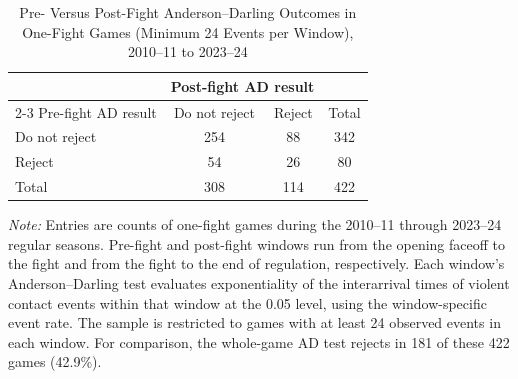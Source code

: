 \begin{table}[htbp]
\centering
\caption{Pre- Versus Post-Fight Anderson--Darling Outcomes in One-Fight Games (Minimum 24 Events per Window), 2010--11 to 2023--24}
\label{tab:one_fight_AD_rejection_min_24_20102011_20232024}
\small
\renewcommand{\arraystretch}{1.15}
\setlength{\tabcolsep}{6pt}

\begin{tabular*}{0.78\textwidth}{@{\extracolsep{\fill}}lccc}
\toprule
 & \multicolumn{2}{c}{Post-fight AD result} & \\
\cmidrule(lr){2-3}
Pre-fight AD result & Do not reject & Reject & Total \\
\midrule
Do not reject & 254 & 88 & 342 \\
Reject & 54 & 26 & 80 \\
\midrule
Total & 308 & 114 & 422 \\
\bottomrule
\end{tabular*}

\vspace{0.4em}
\parbox{0.78\textwidth}{
\footnotesize
\textit{Note:} Entries are counts of one-fight games during the 2010--11 through 2023--24 regular seasons. Pre-fight and post-fight windows run from the opening faceoff to the fight and from the fight to the end of regulation, respectively. Each window's Anderson--Darling test evaluates exponentiality of the interarrival times of violent contact events within that window at the 0.05 level, using the window-specific event rate. The sample is restricted to games with at least 24 observed events in each window. For comparison, the whole-game AD test rejects in 181 of these 422 games (42.9\%).
}
\end{table}
